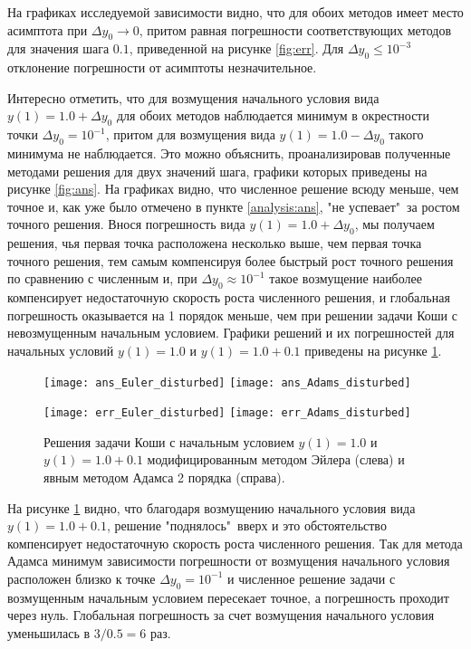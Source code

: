 \documentclass[a4paper, 12pt]{article}
\theoremstyle{mythm}
\begin{document}
	На графиках исследуемой зависимости видно, что для обоих методов имеет место асимптота при $\Delta y_0 \rightarrow 0$, притом равная погрешности соответствующих методов для значения шага $0.1$, приведенной на рисунке \ref{fig:err}. Для $\Delta y_0 \leq 10^{-3}$ отклонение погрешности от асимптоты незначительное. 
	
	Интересно отметить, что для возмущения начального условия вида $y(1)=1.0+\Delta y_0$ для обоих методов наблюдается минимум в окрестности точки $\Delta y_0 = 10^{-1}$, притом для возмущения вида $y(1)=1.0-\Delta y_0$ такого минимума не наблюдается. Это можно объяснить, проанализировав полученные методами решения для двух значений шага, графики которых приведены на рисунке \ref{fig:ans}. На графиках видно, что численное решение всюду меньше, чем точное и, как уже было отмечено в пункте \ref{analysis:ans}, "не успевает"\ за ростом точного решения. Внося погрешность вида $y(1)=1.0+\Delta y_0$, мы получаем решения, чья первая точка расположена несколько выше, чем первая точка точного решения, тем самым компенсируя более быстрый рост точного решения по сравнению с численным и, при $\Delta y_0 \approx 10^{-1}$ такое возмущение наиболее компенсирует недостаточную скорость роста численного решения, и глобальная погрешность оказывается на 1 порядок меньше, чем при решении задачи Коши с невозмущенным начальным условием. Графики решений и их погрешностей для  начальных условий $y(1)=1.0$ и $y(1)=1.0+0.1$ приведены на рисунке \ref{fig:disturbed}.
	
	\begin{figure}[H]\centering
		\texttt{[image: ans\_Euler\_disturbed]}
		\texttt{[image: ans\_Adams\_disturbed]}
	\end{figure}
	
	\begin{figure}[H]\centering
		\texttt{[image: err\_Euler\_disturbed]}
		\texttt{[image: err\_Adams\_disturbed]}
		\caption{Решения задачи Коши с начальным условием $y(1)=1.0$ и $y(1)=1.0+0.1$ модифицированным методом Эйлера (слева) и явным методом Адамса 2 порядка (справа).}\label{fig:disturbed}
	\end{figure}

	На рисунке \ref{fig:disturbed} видно, что благодаря возмущению начального условия вида $y(1)=1.0 + 0.1$, решение "поднялось"\ вверх и это обстоятельство компенсирует недостаточную скорость роста численного решения. Так для метода Адамса минимум зависимости погрешности от возмущения начального условия расположен близко к точке $\Delta y_0 = 10^{-1}$ и численное решение задачи с возмущенным начальным условием пересекает точное, а погрешность проходит через нуль. Глобальная погрешность за счет возмущения начального условия уменьшилась в $3/0.5=6$ раз.
	
\end{document}

